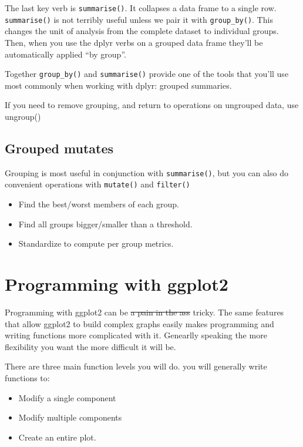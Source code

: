 \documentclass[]{book}
\providecommand{\tightlist}{%
  \setlength{\itemsep}{0pt}\setlength{\parskip}{0pt}}
\theoremstyle{definition}
\theoremstyle{definition}
\theoremstyle{definition}
\theoremstyle{remark}
\let\BeginKnitrBlock\begin \let\EndKnitrBlock\end
\begin{document}
The last key verb is \texttt{summarise()}. It collapses a data frame to
a single row. \texttt{summarise()} is not terribly useful unless we pair
it with \texttt{group\_by()}. This changes the unit of analysis from the
complete dataset to individual groups. Then, when you use the dplyr
verbs on a grouped data frame they'll be automatically applied ``by
group''.

Together \texttt{group\_by()} and \texttt{summarise()} provide one of
the tools that you'll use most commonly when working with dplyr: grouped
summaries.

\BeginKnitrBlock{rmdimportant}
If you need to remove grouping, and return to operations on ungrouped
data, use ungroup()
\EndKnitrBlock{rmdimportant}

\hypertarget{grouped-mutates}{%
\section{Grouped mutates}\label{grouped-mutates}}

Grouping is most useful in conjunction with \texttt{summarise()}, but
you can also do convenient operations with \texttt{mutate()} and
\texttt{filter()}

\begin{itemize}
\tightlist
\item
  Find the best/worst members of each group.
\item
  Find all groups bigger/smaller than a threshold.
\item
  Standardize to compute per group metrics.
\end{itemize}

\hypertarget{programming-with-ggplot2}{%
\chapter{Programming with ggplot2}\label{programming-with-ggplot2}}

Programming with ggplot2 can be \sout{a pain in the ass} tricky. The
same features that allow ggplot2 to build complex graphs easily makes
programming and writing functions more complicated with it. Genearlly
speaking the more flexibility you want the more difficult it will be.

There are three main function levels you will do. you will generally
write functions to:

\begin{itemize}
\tightlist
\item
  Modify a single component
\item
  Modify multiple components
\item
  Create an entire plot.
\end{itemize}
\end{document}
